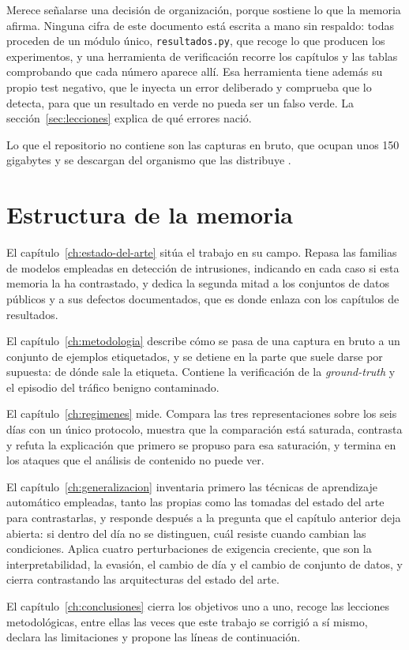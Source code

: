 Merece señalarse una decisión de organización, porque sostiene lo que la
memoria afirma. Ninguna cifra de este documento está escrita a mano sin
respaldo: todas proceden de un módulo único, \texttt{resultados.py}, que recoge
lo que producen los experimentos, y una herramienta de verificación recorre los
capítulos y las tablas comprobando que cada número aparece allí. Esa herramienta
tiene además su propio test negativo, que le inyecta un error deliberado y
comprueba que lo detecta, para que un resultado en verde no pueda ser un
falso verde. La sección~\ref{sec:lecciones} explica de qué errores nació.

Lo que el repositorio no contiene son las capturas en bruto, que ocupan unos 150
gigabytes y se descargan del organismo que las distribuye \cite{CSECICIDS2018}.

\section{Estructura de la memoria}
\label{sec:estructura}

El capítulo~\ref{ch:estado-del-arte} sitúa el trabajo en su campo. Repasa las
familias de modelos empleadas en detección de intrusiones, indicando en cada
caso si esta memoria la ha contrastado, y dedica la segunda mitad a los
conjuntos de datos públicos y a sus defectos documentados, que es donde enlaza
con los capítulos de resultados.

El capítulo~\ref{ch:metodologia} describe cómo se pasa de una captura en bruto a
un conjunto de ejemplos etiquetados, y se detiene en la parte que suele darse
por supuesta: de dónde sale la etiqueta. Contiene la verificación de la
\emph{ground-truth} y el episodio del tráfico benigno contaminado.

El capítulo~\ref{ch:regimenes} mide. Compara las tres representaciones sobre los
seis días con un único protocolo, muestra que la comparación está saturada,
contrasta y refuta la explicación que primero se propuso para esa saturación, y
termina en los ataques que el análisis de contenido no puede ver.

El capítulo~\ref{ch:generalizacion} inventaria primero las técnicas de
aprendizaje automático empleadas, tanto las propias como las tomadas del estado
del arte para contrastarlas, y responde después a la pregunta que el capítulo
anterior deja abierta: si dentro del día no se distinguen, cuál resiste cuando
cambian las condiciones. Aplica cuatro perturbaciones de exigencia creciente,
que son la interpretabilidad, la evasión, el cambio de día y el cambio de
conjunto de datos, y cierra contrastando las arquitecturas del estado del arte.

El capítulo~\ref{ch:conclusiones} cierra los objetivos uno a uno, recoge las
lecciones metodológicas, entre ellas las veces que este trabajo se corrigió a sí
mismo, declara las limitaciones y propone las líneas de continuación.
